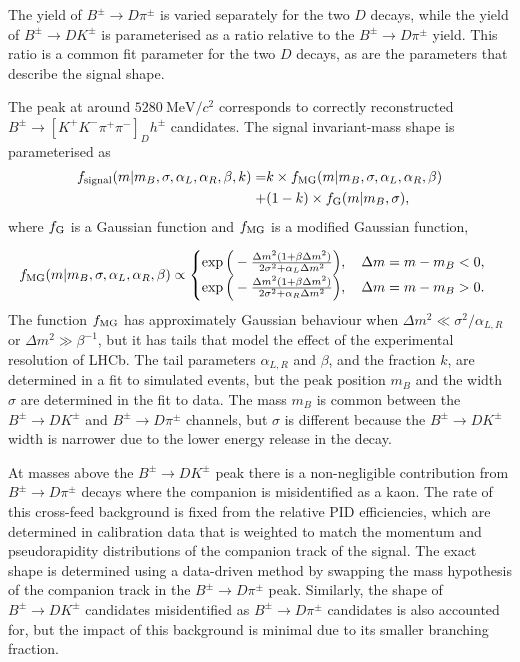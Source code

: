 \documentclass[12pt, a4paper, notitlepage, onecolumn]{article}
\begin{document}
The yield of $B^\pm\to D\pi^\pm$ is varied separately for the two $D$ decays, while the yield of $B^\pm\to DK^\pm$ is parameterised as a ratio relative to the $B^\pm\to D\pi^\pm$ yield. This ratio is a common fit parameter for the two $D$ decays, as are the parameters that describe the signal shape.

The peak at around $\SI{5280}{\mega\eV/c^2}$ corresponds to correctly reconstructed $B^\pm\to[K^+K^-\pi^+\pi^-]_Dh^\pm$ candidates. The signal invariant-mass shape is parameterised as
\begin{equation}
    \begin{aligned}
        f_{\rm signal}(m|m_B, \sigma, \alpha_L, \alpha_R, \beta, k) =& k\times f_{\rm MG}(m|m_B, \sigma, \alpha_L, \alpha_R, \beta) \\
                                                                     +& (1 - k)\times f_{\rm G}(m|m_B, \sigma),
    \end{aligned}
\end{equation}
where $f_{\rm G}$ is a Gaussian function and $f_{\rm MG}$ is a modified Gaussian function,

\begin{equation}
    f_{\rm MG}(m|m_B, \sigma, \alpha_L, \alpha_R, \beta)\propto
    \begin{cases}
        \exp\Big(-\frac{\Delta m^2(1 + \beta\Delta m^2)}{2\sigma^2 + \alpha_L\Delta m^2}\Big), \quad \Delta m = m - m_B < 0, \\
        \exp\Big(-\frac{\Delta m^2(1 + \beta\Delta m^2)}{2\sigma^2 + \alpha_R\Delta m^2}\Big), \quad \Delta m = m - m_B > 0.
    \end{cases}
\end{equation}
The function $f_{\rm MG}$ has approximately Gaussian behaviour when $\Delta m^2\ll\sigma^2/\alpha_{L, R}$ or $\Delta m^2\gg\beta^{-1}$, but it has tails that model the effect of the experimental resolution of LHCb. The tail parameters $\alpha_{L, R}$ and $\beta$, and the fraction $k$, are determined in a fit to simulated events, but the peak position $m_B$ and the width $\sigma$ are determined in the fit to data. The mass $m_B$ is common between the $B^\pm\to DK^\pm$ and $B^\pm\to D\pi^\pm$ channels, but $\sigma$ is different because the $B^\pm\to DK^\pm$ width is narrower due to the lower energy release in the decay.

At masses above the $B^\pm\to DK^\pm$ peak there is a non-negligible contribution from $B^\pm\to D\pi^\pm$ decays where the companion is misidentified as a kaon. The rate of this cross-feed background is fixed from the relative PID efficiencies, which are determined in calibration data that is weighted to match the momentum and pseudorapidity distributions of the companion track of the signal. The exact shape is determined using a data-driven method by swapping the mass hypothesis of the companion track in the $B^\pm\to D\pi^\pm$ peak. Similarly, the shape of $B^\pm\to DK^\pm$ candidates misidentified as $B^\pm\to D\pi^\pm$ candidates is also accounted for, but the impact of this background is minimal due to its smaller branching fraction.
\end{document}
